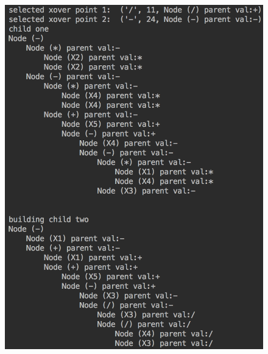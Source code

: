 \documentclass[11pt]{article}
\begin{document}
\begin{figure}[h]
\includegraphics[scale = .60]{3}
\end{figure}
\end{document}
